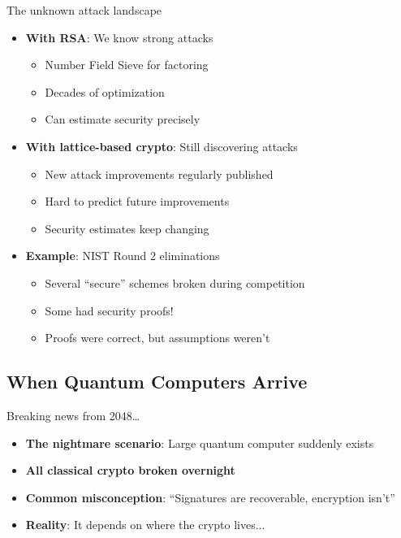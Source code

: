 \documentclass[aspectratio=169, lualatex, handout]{beamer}
\begin{document}
\begin{frame}{The unknown attack landscape}
	\begin{itemize}
		\item \textbf{With RSA}: We know strong attacks
		      \begin{itemize}
			      \item Number Field Sieve for factoring
			      \item Decades of optimization
			      \item Can estimate security precisely
		      \end{itemize}
		\item \textbf{With lattice-based crypto}: Still discovering attacks
		      \begin{itemize}
			      \item New attack improvements regularly published
			      \item Hard to predict future improvements
			      \item Security estimates keep changing
		      \end{itemize}
		\item \textbf{Example}: NIST Round 2 eliminations
		      \begin{itemize}
			      \item Several ``secure'' schemes broken during competition
			      \item Some had security proofs!
			      \item Proofs were correct, but assumptions weren't
		      \end{itemize}
	\end{itemize}
\end{frame}

\subsection{When Quantum Computers Arrive}
\begin{frame}{Breaking news from 2048\ldots}
	\begin{itemize}
		\item \textbf{The nightmare scenario}: Large quantum computer suddenly exists
		\item \textbf{All classical crypto broken overnight}
		\item \textbf{Common misconception}: ``Signatures are recoverable, encryption isn't''
		\item \textbf{Reality}: It depends on where the crypto lives...
	\end{itemize}
\end{frame}
\end{document}
